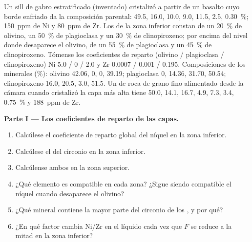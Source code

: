 \begin{problem}
\label{pb:b2:magmatic-differentiation:1}
Un sill de gabro estratificado (inventado) cristalizó a partir de un basalto cuyo borde enfriado
da la composición parental:  49.5,  16.0,  10.0,
 9.0,  11.5,  2.5,  \qty{0.30}{\percent};
\qty{150}{ppm} de Ni y \qty{80}{ppm} de Zr. Los  de la zona inferior constan de un
\qty{20}{\percent} de olivino, un \qty{50}{\percent} de plagioclasa y un \qty{30}{\percent} de
clinopiroxeno; por encima del nivel donde desaparece el olivino, de un \qty{55}{\percent} de
plagioclasa y un \qty{45}{\percent} de clinopiroxeno. Tómense los coeficientes de reparto
(olivino / plagioclasa / clinopiroxeno) Ni 5.0 / 0 / 2.0 y Zr 0.0007 / 0.001 /
0.195. Composiciones de los minerales (\unit{\percent}): olivino  42.06,  0,
 0,  39.19; plagioclasa 0, 14.36, 31.70, 50.54; clinopiroxeno
16.0, 20.5, 3.0, 51.5. Un 
de roca de grano fino alimentado desde la cámara cuando cristalizó la capa más alta tiene
 50.0,  14.1,  16.7,  4.9,  7.3,
 3.4,  \qty{0.75}{\percent} y \qty{188}{ppm} de Zr.

\noindent\textbf{Parte I --- Los coeficientes de reparto de las capas.}
\begin{enumerate}
\item Calcúlese el coeficiente de reparto global del níquel en la zona inferior.
\item Calcúlese el del circonio en la zona inferior.
\item Calcúlense ambos en la zona superior.
\item ¿Qué elemento es compatible en cada zona? ¿Sigue siendo compatible el níquel cuando
desaparece el olivino?
\item ¿Qué mineral contiene la mayor parte del circonio de los , y por qué?
\item ¿En qué factor cambia Ni/Zr en el líquido cada vez que $F$ se reduce a la mitad en la zona
inferior?
\end{enumerate}


\end{problem}
